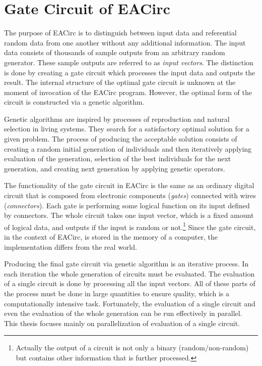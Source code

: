 \documentclass[12pt,twoside]{fithesis2}
\begin{document}
\chapter{Gate Circuit of EACirc}

The purpose of EACirc is to distinguish between input data and referential random data from one another without any additional information. The input data consists of thousands of sample outputs from an arbitrary random generator. These sample outputs are referred to as \emph{input vectors}. The distinction is done by creating a gate circuit which processes the input data and outputs the result. The internal structure of the optimal gate circuit is unknown at the moment of invocation of the EACirc program. However, the optimal form of the circuit is constructed via a genetic algorithm.~\cite{ukrop_thesis}

Genetic algorithms are inspired by processes of reproduction and natural selection in living systems. They search for a satisfactory optimal solution for a given problem. The process of producing the acceptable solution consists of creating a random initial generation of individuals and then iteratively applying evaluation of the generation, selection of the best individuals for the next generation, and creating next generation by applying genetic operators.~\cite{genetic_algorithms}

The functionality of the gate circuit in EACirc is the same as an ordinary digital circuit that is composed from electronic components (\emph{gates}) connected with wires (\emph{connectors}). Each gate is performing some logical function on its input defined by connectors. The whole circuit takes one input vector, which is a fixed amount of logical data, and outputs if the input is random or not.\footnote{Actually the output of a circuit is not only a binary (random/non-random) but contains other information that is further processed.} Since the gate circuit, in the context of EACirc, is stored in the memory of a computer, the implementation differs from the real world.

Producing the final gate circuit via genetic algorithm is an iterative process. In each iteration the whole generation of circuits must be evaluated. The evaluation of a single circuit is done by processing all the input vectors. All of these parts of the process must be done in large quantities to ensure quality, which is a computationally intensive task. Fortunately, the evaluation of a single circuit and even the evaluation of the whole generation can be run effectively in parallel. This thesis focuses mainly on parallelization of evaluation of a single circuit.
\end{document}
